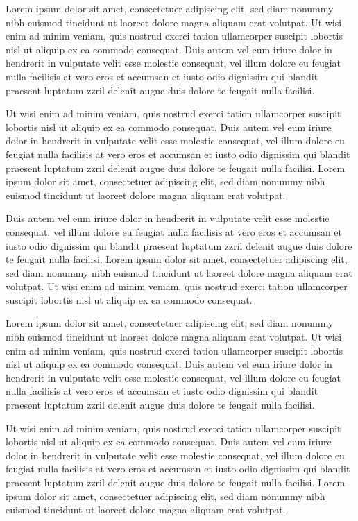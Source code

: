 \documentclass[oldfontcommands,6x9]{pupbook}
\begin{document}
Lorem ipsum dolor sit amet, consectetuer adipiscing elit, sed diam
nonummy nibh euismod tincidunt ut laoreet dolore magna aliquam erat
volutpat. Ut wisi enim ad minim veniam, quis nostrud exerci tation
ullamcorper suscipit lobortis nisl ut aliquip ex ea commodo consequat.
Duis autem vel eum iriure dolor in hendrerit in vulputate velit esse
molestie consequat, vel illum dolore eu feugiat nulla facilisis at vero
eros et accumsan et iusto odio dignissim qui blandit praesent luptatum
zzril delenit augue duis dolore te feugait nulla facilisi. 

Ut wisi enim ad minim veniam, quis nostrud exerci tation ullamcorper
suscipit lobortis nisl ut aliquip ex ea commodo consequat. Duis autem
vel eum iriure dolor in hendrerit in vulputate velit esse molestie
consequat, vel illum dolore eu feugiat nulla facilisis at vero eros et
accumsan et iusto odio dignissim qui blandit praesent luptatum zzril
delenit augue duis dolore te feugait nulla facilisi. Lorem ipsum dolor
sit amet, consectetuer adipiscing elit, sed diam nonummy nibh euismod
tincidunt ut laoreet dolore magna aliquam erat volutpat. 

Duis autem vel eum iriure dolor in hendrerit in vulputate velit esse
molestie consequat, vel illum dolore eu feugiat nulla facilisis at vero
eros et accumsan et iusto odio dignissim qui blandit praesent luptatum
zzril delenit augue duis dolore te feugait nulla facilisi. Lorem ipsum
dolor sit amet, consectetuer adipiscing elit, sed diam nonummy nibh
euismod tincidunt ut laoreet dolore magna aliquam erat volutpat. Ut wisi
enim ad minim veniam, quis nostrud exerci tation ullamcorper suscipit
lobortis nisl ut aliquip ex ea commodo consequat. 

Lorem ipsum dolor sit amet, consectetuer adipiscing elit, sed diam
nonummy nibh euismod tincidunt ut laoreet dolore magna aliquam erat
volutpat. Ut wisi enim ad minim veniam, quis nostrud exerci tation
ullamcorper suscipit lobortis nisl ut aliquip ex ea commodo consequat.
Duis autem vel eum iriure dolor in hendrerit in vulputate velit esse
molestie consequat, vel illum dolore eu feugiat nulla facilisis at vero
eros et accumsan et iusto odio dignissim qui blandit praesent luptatum
zzril delenit augue duis dolore te feugait nulla facilisi. 

Ut wisi enim ad minim veniam, quis nostrud exerci tation ullamcorper
suscipit lobortis nisl ut aliquip ex ea commodo consequat. Duis autem
vel eum iriure dolor in hendrerit in vulputate velit esse molestie
consequat, vel illum dolore eu feugiat nulla facilisis at vero eros et
accumsan et iusto odio dignissim qui blandit praesent luptatum zzril
delenit augue duis dolore te feugait nulla facilisi. Lorem ipsum dolor
sit amet, consectetuer adipiscing elit, sed diam nonummy nibh euismod
tincidunt ut laoreet dolore magna aliquam erat volutpat. 
\end{document}
